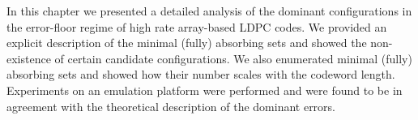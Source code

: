 In this chapter we presented a detailed analysis of the dominant
configurations in the error-floor regime of high rate array-based
LDPC codes. We provided an explicit description of the minimal
(fully) absorbing sets and showed the non-existence of certain
candidate configurations. We also enumerated minimal (fully)
absorbing sets and showed how their number scales with the codeword
length. Experiments on an emulation platform were performed and were
found to be in agreement with the theoretical description of the
dominant errors.
